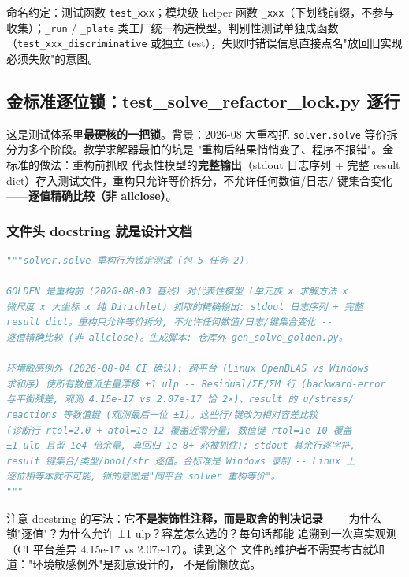 \documentclass[12pt,a4paper]{ctexart}
\newcommand{\fem}{\Verb}
\begin{document}
命名约定：测试函数 \fem|test_xxx|；模块级 helper 函数
\fem|_xxx|（下划线前缀，不参与收集）；\fem|_run| / \fem|_plate|
类工厂统一构造模型。判别性测试单独成函数（\fem|test_xxx_discriminative|
或独立 test），失败时错误信息直接点名"放回旧实现必须失败"的意图。

\subsection{金标准逐位锁：test\_solve\_refactor\_lock.py 逐行}

这是测试体系里\textbf{最硬核的一把锁}。背景：2026-08 大重构把
\fem|solver.solve| 等价拆分为多个阶段。教学求解器最怕的坑是
"重构后结果悄悄变了、程序不报错"。金标准的做法：重构前抓取
代表性模型的\textbf{完整输出}（stdout 日志序列 + 完整 result
dict）存入测试文件，重构只允许等价拆分，不允许任何数值/日志/
键集合变化——\textbf{逐值精确比较（非 allclose）}。

\subsubsection{文件头 docstring 就是设计文档}

\begin{lstlisting}[language=python]
"""solver.solve 重构行为锁定测试 (包 5 任务 2).

GOLDEN 是重构前 (2026-08-03 基线) 对代表性模型 (单元族 x 求解方法 x
微尺度 x 大坐标 x 纯 Dirichlet) 抓取的精确输出: stdout 日志序列 + 完整
result dict。重构只允许等价拆分, 不允许任何数值/日志/键集合变化 --
逐值精确比较 (非 allclose)。生成脚本: 仓库外 gen_solve_golden.py。

环境敏感例外 (2026-08-04 CI 确认): 跨平台 (Linux OpenBLAS vs Windows
求和序) 使所有数值派生量漂移 ±1 ulp -- Residual/ΣF/ΣM 行 (backward-error
与平衡残差, 观测 4.15e-17 vs 2.07e-17 恰 2×)、result 的 u/stress/
reactions 等数值键 (观测最后一位 ±1)。这些行/键改为相对容差比较
(诊断行 rtol=2.0 + atol=1e-12 覆盖近零分量; 数值键 rtol=1e-10 覆盖
±1 ulp 且留 1e4 倍余量, 真回归 1e-8+ 必被抓住); stdout 其余行逐字符,
result 键集合/类型/bool/str 逐值。金标准是 Windows 录制 -- Linux 上
逐位相等本就不可能, 锁的意图是"同平台 solver 重构等价"。
"""
\end{lstlisting}

注意 docstring 的写法：它\textbf{不是装饰性注释，而是取舍的判决记录}
——为什么锁"逐值"？为什么允许 ±1 ulp？容差怎么选的？每句话都能
追溯到一次真实观测（CI 平台差异 4.15e-17 vs 2.07e-17）。读到这个
文件的维护者不需要考古就知道："环境敏感例外"是刻意设计的，
不是偷懒放宽。
\end{document}
